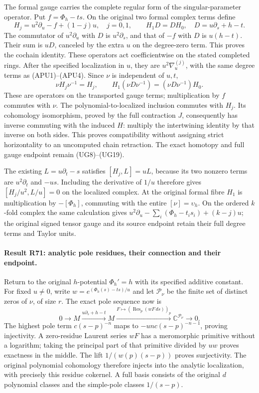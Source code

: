The formal gauge carries the complete regular form of the
singular-parameter operator. Put \(f=\Phi_h-ts\). On the original
two formal complex terms define
\[
 H_j=u^2\partial_u-f+(1-j)u,\quad j=0,1,\qquad
 H_1D=DH_0,\quad D=u\partial_s+h-t.
\]
The commutator of \(u^2\partial_u\) with \(D\) is
\(u^2\partial_s\), and that of \(-f\) with \(D\) is
\(u(h-t)\). Their sum is \(uD\), canceled by the extra \(u\)
on the degree-zero term. This proves the cochain identity.
These operators act coefficientwise on the stated completed
rings. After the specified localization in \(u\), they are
\(u^2\nabla_u^{(j)}\), with the same degree terms as
(APU1)--(APU4). Since \(\nu\) is independent of \(u,t\),
\[
 \nu H_j\nu^{-1}=H_j,\qquad
 H_1(\nu D\nu^{-1})=(\nu D\nu^{-1})H_0.
\]
These are operators on the transported gauge terms;
multiplication by \(f\) commutes with \(\nu\).
The polynomial-to-localized inclusion commutes with \(H_j\).
Its cohomology isomorphism, proved by the full contraction \(J\),
consequently has inverse commuting with the induced \(H\):
multiply the intertwining identity by that inverse on both
sides. This proves compatibility without assigning strict
horizontality to an uncomputed chain retraction. The exact
homotopy and full gauge endpoint remain (UG8)--(UG19).

The existing \(L=u\partial_t-s\) satisfies
\([H_j,L]=uL\), because its two nonzero terms are
\(u^2\partial_t\) and \(-us\). Including the derivative of
\(1/u\) therefore gives
\([H_j/u^2,L/u]=0\) on the localized complex.
At the original formal fibre \(H_1\) is multiplication by
\(-[\Phi_h]\), commuting with the entire \([\nu]=\upsilon_h\).
On the ordered \(k\)-fold complex the same calculation gives
\(u^2\partial_u-\sum_i(\Phi_h-t_is_i)+(k-j)u\);
the original signed tensor gauge and its source endpoint retain
their full degree terms and Taylor units.

\paragraph{Result R71: analytic pole residues, their connection and their endpoint.}
Return to the original $h$-potential $\Phi_h'=h$ with its
specified additive constant. For fixed $u\ne0$, write
$w=e^{(\Phi_h(s)-ts)/u}$ and let
$\mathcal P_\nu$ be the finite set of distinct zeros of $\nu$,
of size $r$. The exact pole sequence now is
\[
0\longrightarrow M\xrightarrow{u\partial_s+h-t}M
\xrightarrow{F\mapsto(\operatorname{Res}_p(wF\,ds))_p}
\mathbb C^{\mathcal P_\nu}\longrightarrow0.
\]
The highest pole term $c(s-p)^{-n}$ maps to
$-unc(s-p)^{-n-1}$, proving injectivity. A zero-residue
Laurent series $wF$ has a meromorphic primitive without a
logarithm; taking the principal part of that primitive
divided by $uw$ proves exactness in the middle.
The lift $1/(w(p)(s-p))$ proves surjectivity.
The original polynomial cohomology therefore injects into
the analytic localization, with precisely this residue
cokernel. A full basis consists of the original $d$ polynomial
classes and the simple-pole classes $1/(s-p)$.

